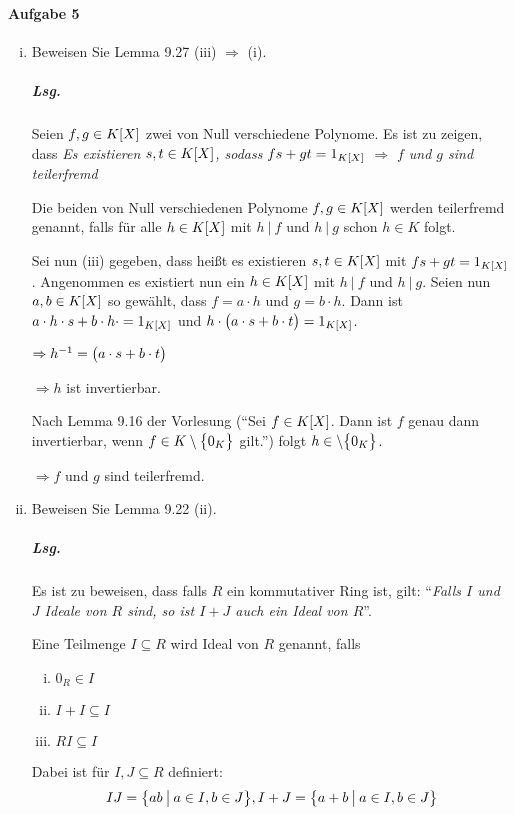 \documentclass{scrreprt}
\begin{document}
\paragraph{Aufgabe 5}
\begin{enumerate}[(i)]
\item Beweisen Sie Lemma 9.27 (iii) $\Rightarrow$ (i).

  \subparagraph{Lsg.} Seien $f, g \in K\qty[X]$ zwei von Null verschiedene
  Polynome.
  Es ist zu zeigen, dass \emph{Es existieren $s, t \in K\qty[X]$, sodass
    $fs + gt = 1_{K\qty[X]}$} $\Rightarrow$ \emph{$f$ und $g$ sind teilerfremd}

  Die beiden von Null verschiedenen Polynome $f, g \in K\qty[X]$ werden
  teilerfremd genannt, falls für alle $h \in K\qty[X]$ mit $h \:{\big |}\: f$
  und $h \:{\big |}\: g$ schon $h \in K$ folgt.

  Sei nun (iii) gegeben, dass heißt es existieren $s, t \in K\qty[X]$ mit
  $fs + gt = 1_{K\qty[X]}$.
  Angenommen es existiert nun ein $h \in K\qty[X]$ mit $h \:{\big |}\: f$
  und $h \:{\big |}\: g$.
  Seien nun $a, b \in K\qty[X]$ so gewählt, dass $f = a \cdot h$ und
  $g = b \cdot h$.
  Dann ist $a \cdot h \cdot s + b \cdot h \cdot = 1_{K\qty[X]}$ und
  $h \cdot \qty\big(a \cdot s + b \cdot t) = 1_{K\qty[X]}$.

  $\Rightarrow h^{-1} = \qty\big(a \cdot s + b \cdot t)$

  $\Rightarrow h$ ist invertierbar.

  Nach Lemma 9.16 der Vorlesung (``Sei $f \in K\qty[X]$.
  Dann ist $f$ genau dann invertierbar, wenn
  $f \in K \setminus \qty\big{0_K}$ gilt.'') folgt
  $h \in \setminus \qty\big{0_K}$.

  $\Rightarrow f$ und $g$ sind teilerfremd.

\item Beweisen Sie Lemma 9.22 (ii).

  \subparagraph{Lsg.} Es ist zu beweisen, dass falls $R$ ein kommutativer Ring
  ist, gilt: ``\emph{Falls $I$ und $J$ Ideale von $R$ sind, so ist $I + J$ auch
    ein Ideal von $R$}''.

  Eine Teilmenge $I \subseteq R$ wird Ideal von $R$ genannt, falls
  \begin{enumerate}[(i)]
  \item $0_R \in I$
  \item $I + I \subseteq I$
  \item $RI \subseteq I$
  \end{enumerate}
  Dabei ist für $I, J \subseteq R$ definiert:
  \[
    IJ = \qty{ab \:{\big |}\: a \in I, b \in J},
    I + J = \qty{a + b \:{\big |}\: a \in I, b \in J}
  \]


\end{enumerate}
\end{document}
